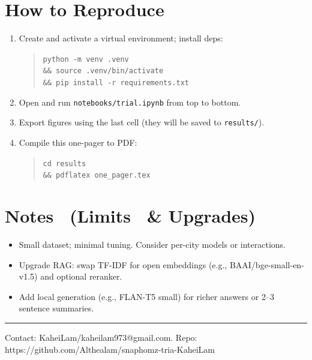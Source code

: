 \documentclass[11pt]{article}
\begin{document}
\section*{How to Reproduce}
\begin{enumerate}[leftmargin=*]
  \item Create and activate a virtual environment; install deps:
  \begin{quote}\small
  \texttt{python -m venv .venv \\ \&\& source .venv/bin/activate \\ \&\& pip install -r requirements.txt}
  \end{quote}
  \item Open and run \texttt{notebooks/trial.ipynb} from top to bottom.
  \item Export figures using the last cell (they will be saved to \texttt{results/}).
  \item Compile this one-pager to PDF:
  \begin{quote}\small
  \texttt{cd results \\ \&\& pdflatex one\_pager.tex}
  \end{quote}
\end{enumerate}

\section*{Notes \ \small (Limits \ \& Upgrades)}
\begin{itemize}[leftmargin=*]
  \item Small dataset; minimal tuning. Consider per-city models or interactions.
  \item Upgrade RAG: swap TF-IDF for open embeddings (e.g., BAAI/bge-small-en-v1.5) and optional reranker.
  \item Add local generation (e.g., FLAN-T5 small) for richer answers or 2--3 sentence summaries.
\end{itemize}

\vfill
\hrule
\small{Contact: KaheiLam/kaheilam973@gmail.com. Repo: https://github.com/Althealam/snaphomz-tria-KaheiLam}
\end{document}
